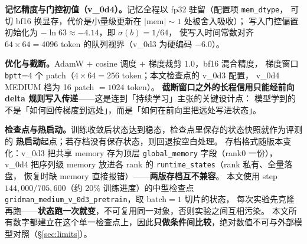 \textbf{记忆精度与门控初值（v\_0d4）。}记忆全程以 fp32 驻留（配置项 \texttt{mem\_dtype}，
可切 bf16 换显存，代价是小量级更新在 $|\mathrm{mem}|\!\sim\!1$ 处被舍入吸收）；
写入门控偏置初始化为 $-\ln 63\approx-4.14$，即 $\sigma(b)=1/64$，
使写入时间常数对齐 $64\times64=4096$ token 的队列视界（v\_0d3 为硬编码 $-6.0$）。

\textbf{优化与截断。}AdamW $+$ cosine 调度 $+$ 梯度裁剪 $1.0$，bf16 混合精度，
梯度窗口 \texttt{bptt}=4 个 patch（$4\times64=256$ token；本文检查点的 v\_0d3 配置，
v\_0d4 MEDIUM 档为 16 patch $=1024$ token）。
\textbf{截断窗口之外的长程信用只能经前向 delta 规则写入传递}——这是连到「持续学习」主张的关键设计点：
模型学到的不是「如何回传梯度到远处」，而是「如何在前向里把远处写进状态」。

\textbf{检查点与热启动。}训练收敛后状态达到稳态，检查点里保存的状态快照就作为评测的
\textbf{热启动}起点；若存档没有保存状态，则回退按空白处理。
存档格式随版本变化：v\_0d3 把共享 memory 存为顶层 \texttt{global\_memory} 字段（rank0 一份），
v\_0d4 把序列级 memory 放进各 rank 的 \texttt{runtime\_states}（rank 私有、全量落盘，
恢复时缺 memory 直接报错）——\textbf{两版存档互不兼容}。
本文使用 step $144{,}000/705{,}600$（约 20\% 训练进度）的中型检查点
\texttt{gridman\_medium\_v\_0d3\_pretrain}，取 batch$=1$ 切片的状态，
每次实验先克隆再跑——\textbf{状态跑一次就变}，不可复用同一对象，否则实验之间互相污染。
本文所有数字都建立在这个单一检查点上，因此\textbf{只做条件间比较}，绝对数值不可与外部模型对照（\S\ref{sec:limits}）。
